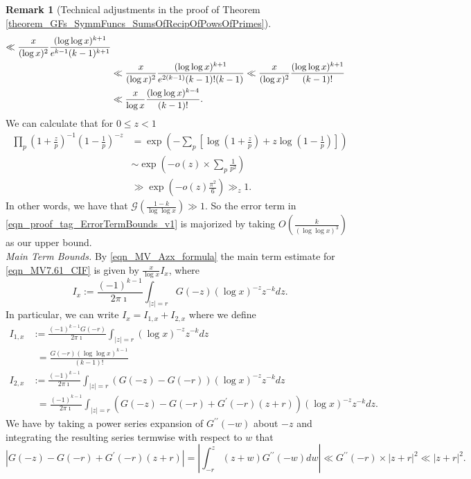 \documentclass[11pt,reqno,a4letter]{article}
\numberwithin{figure}{section}
\numberwithin{table}{section}
\theoremstyle{plain}
\numberwithin{theorem}{section}
\theoremstyle{definition}
\newtheorem{remark}[theorem]{Remark}
\begin{document}
\begin{remark}[Technical adjustments in the proof of Theorem \ref{theorem_GFs_SymmFuncs_SumsOfRecipOfPowsOfPrimes}]
\begin{align}
     \ll \frac{x}{(\log x)^2} \frac{(\log\log x)^{k+1}}{e^{k-1} (k-1)^{k+1}} \\ 
\notag 
     & \ll \frac{x}{(\log x)^2} \frac{(\log\log x)^{k+1}}{e^{2(k-1)} (k-1)! (k-1)} 
     \ll \frac{x}{(\log x)^{2}} \frac{(\log\log x)^{k+1}}{(k-1)!} \\ 
\label{eqn_proof_tag_ErrorTermBounds_v1} 
     & \ll \frac{x}{\log x} \frac{(\log\log x)^{k-4}}{(k-1)!}. 
\end{align} 
We can calculate that for $0 \leq z < 1$ 
\begin{align*} 
\prod_p \left(1 + \frac{z}{p}\right)^{-1} \left(1 - \frac{1}{p}\right)^{-z} & = 
     \exp\left(-\sum_p \left[\log\left(1 + \frac{z}{p}\right) + z 
     \log\left(1 - \frac{1}{p}\right) \right]\right) \\ 
     & \sim \exp\left(-o(z) \times \sum_p \frac{1}{p^2}\right) \\ 
     & \gg \exp\left(-o(z) \frac{\pi^2}{6}\right) \gg_z 1. 
\end{align*} 
In other words, we have that 
$\mathcal{G}\left(\frac{1-k}{\log\log x}\right) \gg 1$. 
So the error term in \eqref{eqn_proof_tag_ErrorTermBounds_v1} 
is majorized by taking $O\left(\frac{k}{(\log\log x)^3}\right)$ as our 
upper bound. \\ 
\textit{Main Term Bounds.} 
By \eqref{eqn_MV_Azx_formula} the main term 
estimate for \eqref{eqn_MV7.61_CIF} 
is given by $\frac{x}{\log x} I_x$, where 
\[
I_x := \frac{(-1)^{k-1}}{2\pi\imath} \int_{|z|=r} G(-z) (\log x)^{-z} z^{-k} dz. 
\]
In particular, we can write $I_x = I_{1,x} + I_{2,x}$ where we define 
\begin{align*} 
I_{1,x} & := \frac{(-1)^{k-1} G(-r)}{2\pi\imath} \int_{|z|=r} (\log x)^{-z} z^{-k} dz \\ 
    & \phantom{:}= \frac{G(-r) (\log\log x)^{k-1}}{(k-1)!} \\ 
I_{2,x} & := \frac{(-1)^{k-1}}{2\pi\imath} \int_{|z|=r} (G(-z) - G(-r)) (\log x)^{-z} z^{-k} dz \\ 
    & \phantom{:}= \frac{(-1)^{k-1}}{2\pi\imath} \int_{|z|=r} (G(-z) - G(-r) + G^{\prime}(-r) (z+r)) 
    (\log x)^{-z} z^{-k} dz. 
\end{align*} 
We have by taking a power series expansion of $G^{\prime\prime}(-w)$ about $-z$ and integrating 
the resulting series termwise with respect to $w$ that 
\[
\left\lvert G(-z) - G(-r) + G^{\prime}(-r) (z+r) \right\rvert = 
     \left\lvert \int_{-r}^{z} (z+w) G^{\prime\prime}(-w) dw \right\rvert \ll 
     G^{\prime\prime}(-r) \times |z+r|^2 \ll |z+r|^2. 
\]
\end{remark}
\end{document}

